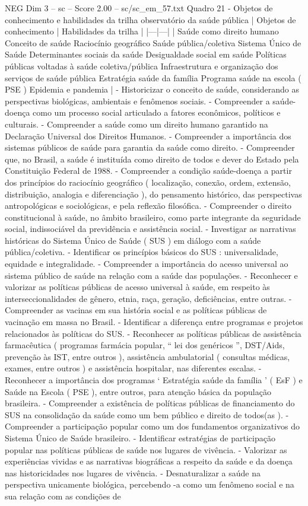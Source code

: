 \begin{textsample}{NEG Dim 3 – sc – Score 2.00 – sc/sc\_em\_57.txt}
Quadro 21 - Objetos de conhecimento e habilidades da trilha observatório da saúde pública | Objetos de conhecimento | Habilidades da trilha | |---|---| | Saúde como direito humano Conceito de saúde Raciocínio geográfico Saúde pública/coletiva Sistema Único de Saúde Determinantes sociais da saúde Desigualdade social em saúde Políticas públicas voltadas à saúde coletiva/pública Infraestrutura e organização dos serviços de saúde pública Estratégia saúde da família Programa saúde na escola ( PSE ) Epidemia e pandemia | - Historicizar o conceito de saúde, considerando as perspectivas biológicas, ambientais e fenômenos sociais. - Compreender a saúde-doença como um processo social articulado a fatores econômicos, políticos e culturais. - Compreender a saúde como um direito humano garantido na Declaração Universal dos Direitos Humanos. - Compreender a importância dos sistemas públicos de saúde para garantia da saúde como direito. - Compreender que, no Brasil, a saúde é instituída como direito de todos e dever do Estado pela Constituição Federal de 1988. - Compreender a condição saúde-doença a partir dos princípios do raciocínio geográfico ( localização, conexão, ordem, extensão, distribuição, analogia e diferenciação ), do pensamento histórico, das perspectivas antropológicas e sociológicas, e pela reflexão filosófica. - Compreender o direito constitucional à saúde, no âmbito brasileiro, como parte integrante da seguridade social, indissociável da previdência e assistência social. - Investigar as narrativas históricas do Sistema Único de Saúde ( SUS ) em diálogo com a saúde pública/coletiva. - Identificar os princípios básicos do SUS : universalidade, equidade e integralidade. - Compreender a importância do acesso universal ao sistema público de saúde na relação com a saúde das populações. - Reconhecer e valorizar as políticas públicas de acesso universal à saúde, em respeito às interseccionalidades de gênero, etnia, raça, geração, deficiências, entre outras. - Compreender as vacinas em sua história social e as políticas públicas de vacinação em massa no Brasil. - Identificar a diferença entre programas e projetos relacionados às políticas do SUS. - Reconhecer as políticas públicas de assistência farmacêutica ( programas farmácia popular, “ lei dos genéricos ”, DST/Aids, prevenção às IST, entre outros ), assistência ambulatorial ( consultas médicas, exames, entre outros ) e assistência hospitalar, nas diferentes escalas. - Reconhecer a importância dos programas ‘ Estratégia saúde da família ’ ( EsF ) e Saúde na Escola ( PSE ), entre outros, para atenção básica da população brasileira. - Compreender a existência de políticas públicas de financiamento do SUS na consolidação da saúde como um bem público e direito de todos(as ). - Compreender a participação popular como um dos fundamentos organizativos do Sistema Único de Saúde brasileiro. - Identificar estratégias de participação popular nas políticas públicas de saúde nos lugares de vivência. - Valorizar as experiências vividas e as narrativas biográficas a respeito da saúde e da doença nas historicidades nos lugares de vivência. - Desnaturalizar a saúde na perspectiva unicamente biológica, percebendo -a como um fenômeno social e na sua relação com as condições de 
\end{textsample}
